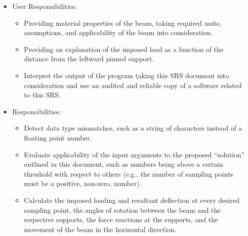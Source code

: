 \documentclass[12pt]{article}
\begin{document}

\begin{itemize}
    \item User Responsibilities:
          \begin{itemize}

              \item Providing material properties of the beam, taking required
                    units, assumptions, and applicability of the beam into
                    consideration.

              \item Providing an explanation of the imposed load as a function
                    of the distance from the leftward pinned support.

              \item Interpret the output of the program taking this SRS document
                    into consideration and use an audited and reliable copy of a
                    software related to this SRS.

          \end{itemize}

    \item \progname{} Responsibilities:
          \begin{itemize}

              \item Detect data type mismatches, such as a string of characters
                    instead of a floating point number.

              \item Evaluate applicability of the input arguments to the
                    proposed ``solution'' outlined in this document, such as
                    numbers being above a certain threshold with respect to
                    others (e.g., the number of sampling points must be a
                    positive, non-zero, number).

              \item Calculate the imposed loading and resultant deflection at
                    every desired sampling point, the angles of rotation between
                    the beam and the respective supports, the force reactions at
                    the supports, and the movement of the beam in the horizontal
                    direction.

          \end{itemize}
\end{itemize}
\end{document}
